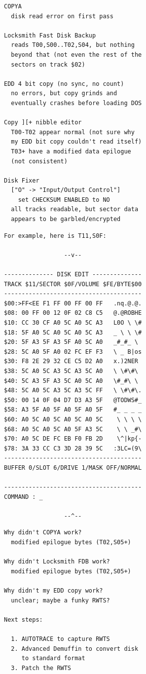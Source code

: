 \documentclass{article}
\begin{document}
\begin{verbatim}
COPYA
  disk read error on first pass

Locksmith Fast Disk Backup
  reads T00,S00..T02,S04, but nothing
  beyond that (not even the rest of the
  sectors on track $02)

EDD 4 bit copy (no sync, no count)
  no errors, but copy grinds and
  eventually crashes before loading DOS

Copy ][+ nibble editor
  T00-T02 appear normal (not sure why
  my EDD bit copy couldn't read itself)
  T03+ have a modified data epilogue
  (not consistent)

Disk Fixer
  ["O" -> "Input/Output Control"]
    set CHECKSUM ENABLED to NO
  all tracks readable, but sector data
  appears to be garbled/encrypted
\end{verbatim}

\newpage

\begin{verbatim}
For example, here is T11,S0F:

                 --v--

-------------- DISK EDIT --------------
TRACK $11/SECTOR $0F/VOLUME $FE/BYTE$00
---------------------------------------
$00:>FF<EE F1 FF 00 FF 00 FF   .nq.@.@.
$08: 00 FF 00 12 0F 02 C8 C5   @.@ROBHE
$10: CC 30 CF A0 5C A0 5C A3   L0O \ \#
$18: 5F A0 5C A0 5C A0 5C A3   _ \ \ \#
$20: 5F A3 5F A3 5F A0 5C A0   _#_#_ \
$28: 5C A0 5F A0 02 FC EF F3   \ _ B|os
$30: F8 2E 29 32 CE C5 D2 A0   x.)2NER
$38: 5C A0 5C A3 5C A3 5C A0   \ \#\#\
$40: 5C A3 5F A3 5C A0 5C A0   \#_#\ \
$48: 5C A0 5C A3 5C A3 5C FF   \ \#\#\.
$50: 00 14 0F 04 D7 D3 A3 5F   @TODWS#_
$58: A3 5F A0 5F A0 5F A0 5F   #_ _ _ _
$60: A0 5C A0 5C A0 5C A0 5C    \ \ \ \
$68: A0 5C A0 5C A0 5F A3 5C    \ \ _#\
$70: A0 5C DE FC EB F0 FB 2D    \^|kp{-
$78: 3A 33 CC C3 3D 28 39 5C   :3LC=(9\
---------------------------------------
BUFFER 0/SLOT 6/DRIVE 1/MASK OFF/NORMAL

---------------------------------------
COMMAND : _

                 --^--
\end{verbatim}

\newpage

\begin{verbatim}
Why didn't COPYA work?
  modified epilogue bytes (T02,S05+)

Why didn't Locksmith FDB work?
  modified epilogue bytes (T02,S05+)

Why didn't my EDD copy work?
  unclear; maybe a funky RWTS?

Next steps:

  1. AUTOTRACE to capture RWTS
  2. Advanced Demuffin to convert disk
     to standard format
  3. Patch the RWTS
\end{verbatim}
\end{document}
